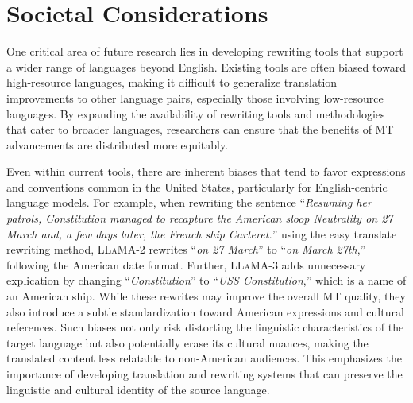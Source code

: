 \section{Societal Considerations}


One critical area of future research lies in developing rewriting tools that support a wider range of languages beyond English. Existing tools are often biased toward high-resource languages, making it difficult to generalize translation improvements to other language pairs, especially those involving low-resource languages. By expanding the availability of rewriting tools and methodologies that cater to broader languages, researchers can ensure that the benefits of MT advancements are distributed more equitably.

Even within current tools, there are inherent biases that tend to favor expressions and conventions common in the United States, particularly for English-centric language models. For example, when rewriting the sentence ``\textit{Resuming her patrols, Constitution managed to recapture the American sloop Neutrality on 27 March and, a few days later, the French ship Carteret.}'' using the easy translate rewriting method, \textsc{LLaMA-2} rewrites ``\textit{on 27 March}'' to ``\textit{on March 27th},'' following the American date format. Further, \textsc{LLaMA-3} adds unnecessary explication by changing ``\textit{Constitution}'' to ``\textit{USS Constitution},'' which is a name of an American ship. While these rewrites may improve the overall MT quality, they also introduce a subtle standardization toward American expressions and cultural references. Such biases not only risk distorting the linguistic characteristics of the target language but also potentially erase its cultural nuances, making the translated content less relatable to non-American audiences. This emphasizes the importance of developing translation and rewriting systems that can preserve the linguistic and cultural identity of the source language.